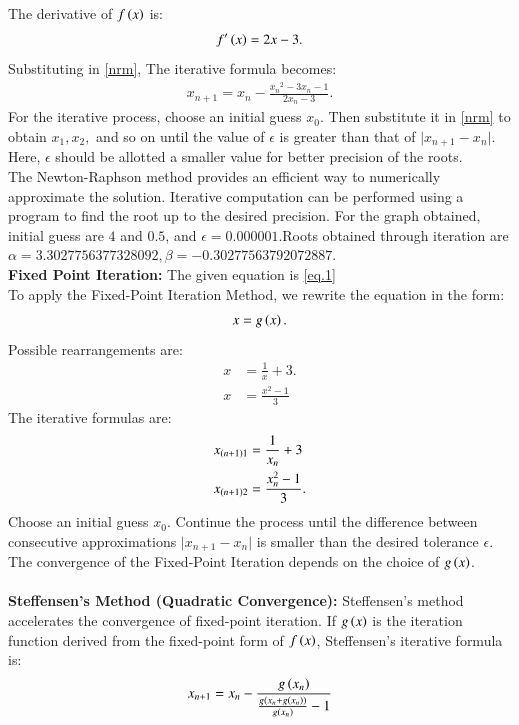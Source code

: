 \documentclass[journal,12pt,onecolumn]{IEEEtran}
\theoremstyle{remark}
\begin{document}
The derivative of $f\left(x\right)$ is:
\begin{align}
f^\prime\left(x\right) = 2x-3.
\end{align}
Substituting in \ref{nrm}, The iterative formula becomes:
\begin{align}
x_{n+1} = x_n - \frac{{x_n}^2 - 3x_n - 1 }{2x_n-3}.
\end{align}
For the iterative process, choose an initial guess $ x_0 $. Then substitute it in \ref{nrm} to obtain $x_1,x_2,$ and so on until the value of $\epsilon$ is greater than that of $ \lvert x_{n+1} - x_n\rvert $. Here, $\epsilon$ should be allotted a smaller value for better precision of the roots.\\
The Newton-Raphson method provides an efficient way to numerically approximate the solution. Iterative computation can be performed using a program to find the root up to the desired precision. For the graph obtained, initial guess are $4$ and $0.5$, and $\epsilon=0.000001$.Roots obtained through iteration are $\alpha=3.3027756377328092,\beta=-0.30277563792072887.$\\
\textbf{Fixed Point Iteration:}
The given equation is \ref{eq.1}\\
To apply the Fixed-Point Iteration Method, we rewrite the equation in the form:
\begin{align}
x = g\left(x\right).\label{fim}
\end{align}
Possible rearrangements are:
\begin{align}
x &= \frac{1}{x} + 3.\\
x&= \frac{x^2 -1}{3}
\end{align}
The iterative formulas are:
\begin{align}
x_{\left(n+1\right)1} &= \frac{1}{x_n} + 3\\
x_{\left(n+1\right)2} &= \frac{x_n^2 -1}{3}.
\end{align}
Choose an initial guess $x_0$. Continue the process until the difference between consecutive approximations $ \lvert x_{n+1} - x_n\rvert $ is smaller than the desired tolerance $\epsilon$. The convergence of the Fixed-Point Iteration depends on the choice of $ g\left(x\right) $. \\\\
\textbf{Steffensen's Method (Quadratic Convergence):}
Steffensen's method accelerates the convergence of fixed-point iteration. If $ g\left(x\right) $ is the iteration function derived from the fixed-point form of $ f\left(x\right) $, Steffensen's iterative formula is:
\begin{align}
x_{n+1} = x_n - \frac{g\left(x_n\right)}{\frac{g\left(x_n+g\left(x_n\right)\right)}{g\left(x_n\right)}-1} \label{sif}
\end{align}
\end{document}
